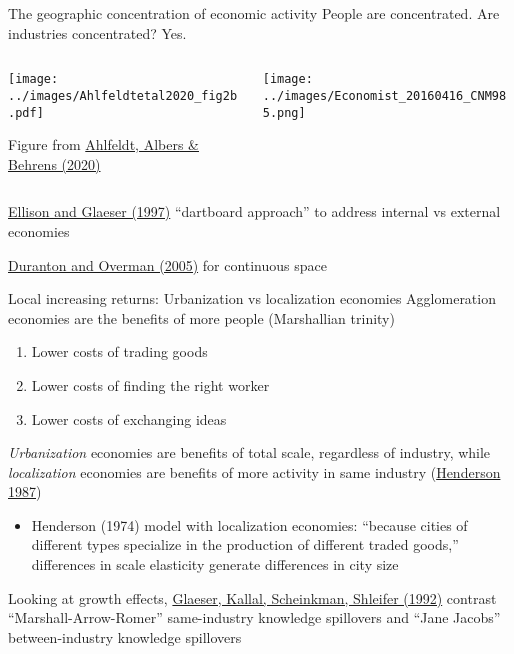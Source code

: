 \documentclass[11pt,notes=hide,aspectratio=169]{beamer}
\begin{document}
\begin{frame}{The geographic concentration of economic activity}
{\footnotesize People are concentrated. Are industries concentrated? Yes.}
\begin{columns}
\begin{column}{0.49\textwidth}
\texttt{[image: ../images/Ahlfeldtetal2020\_fig2b.pdf]}\\
{\scriptsize Figure from \href{https://cep.lse.ac.uk/_NEW/PUBLICATIONS/abstract.asp?index=7318}{Ahlfeldt, Albers \& Behrens (2020)}\par}
\end{column}
\begin{column}{0.49\textwidth}
\texttt{[image: ../images/Economist\_20160416\_CNM985.png]} \\
\end{column}
\end{columns}
\begin{itemize}{\small
	\item \href{https://doi.org/10.1086/262098}{Ellison and Glaeser (1997)} ``dartboard approach'' to address internal vs external economies
	\item \href{https://doi.org/10.1111/0034-6527.00362}{Duranton and Overman (2005)} for continuous space\par
}\end{itemize}
\end{frame}
\begin{frame}{Local increasing returns: Urbanization vs localization economies}
Agglomeration economies are the benefits of more people (Marshallian trinity)
\begin{enumerate}
	\item Lower costs of trading goods
	\item Lower costs of finding the right worker
	\item Lower costs of exchanging ideas
\end{enumerate}
\textit{Urbanization} economies are benefits of total scale, regardless of industry,
while 
\textit{localization} economies are benefits of more activity in same industry
(\href{https://doi.org/10.1016/S1574-0080(87)80009-3}{Henderson 1987})
\begin{itemize}
\item Henderson (1974) model with localization economies: ``because cities of different types specialize in the production of different traded goods,''
differences in scale elasticity generate differences in city size
\end{itemize}
Looking at growth effects,
\href{https://doi.org/10.1086/261856}{Glaeser, Kallal, Scheinkman, Shleifer (1992)} contrast
``Marshall-Arrow-Romer'' same-industry knowledge spillovers 
and
``Jane Jacobs'' between-industry knowledge spillovers
\end{frame}
\end{document}
